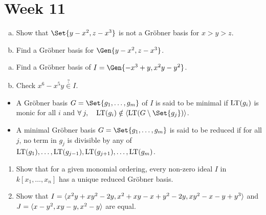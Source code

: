 
\section{Week 11}

\begin{exercise} \mbox{}
  \begin{enumerate}[(a)]
    \item Show that $\Set{ y-x^2, z-x^3 }$ is not a Gr\"obner basis for $x>y>z$.
    \item Find a Gr\"obner basis for $\Gen{ y-x^2, z-x^3 }$.
  \end{enumerate}
\end{exercise}

\begin{exercise} \mbox{}
  \begin{enumerate}[(a)]
    \item Find a Gr\"obner basis of $I = \Gen{ -x^3+y, x^2y - y^2 }$.
    \item Check $x^6 - x^5y \overset{?}{\in} I$.
  \end{enumerate}
\end{exercise}

\begin{definition} \mbox{}
  \begin{itemize}
    \item A Gr\"obner basis $G = \Set{g_1, \dots, g_m}$ of $I$ is said to be
      minimal if $\operatorname{LT}(g_i)$ is monic for all $i$ and $\forall j, \quad
      \LT(g_i) \notin \gen{\LT(G \setminus\Set{g_j})}$.
    \item A minimal Gr\"obner basis $G = \Set{g_1, \dots, g_m}$ is said to be
      reduced if for all $j$, no term in $g_j$ is divisible by any of
      $\operatorname{LT}(g_1), \dots, \operatorname{LT}(g_{j-1}), \operatorname{LT}(g_{j+1}), \dots, \operatorname{LT}(g_m)$.
  \end{itemize}
\end{definition}

\begin{exercise} \mbox{}
  \begin{enumerate}
    \item Show that for a given monomial ordering, every non-zero ideal $I$ in
      $k[x_1, \dots, x_n]$ has a unique reduced Gr\"obner basis.
    \item Show that $I = \langle x^2y+xy^2-2y, x^2+xy-x+y^2-2y, xy^2-x-y+y^3\rangle$
      and $J = \langle x-y^2, xy-y, x^2-y\rangle$ are equal.
  \end{enumerate}
\end{exercise}

